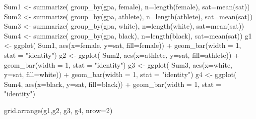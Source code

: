 \documentclass[
]{article}
\newenvironment{Shaded}{\begin{snugshade}}{\end{snugshade}}
\newcommand{\AttributeTok}[1]{\textcolor[rgb]{0.80,0.80,0.80}{#1}}
\newcommand{\DecValTok}[1]{\textcolor[rgb]{0.86,0.86,0.80}{#1}}
\newcommand{\FunctionTok}[1]{\textcolor[rgb]{0.94,0.94,0.56}{#1}}
\newcommand{\NormalTok}[1]{\textcolor[rgb]{0.80,0.80,0.80}{#1}}
\newcommand{\OtherTok}[1]{\textcolor[rgb]{0.94,0.94,0.56}{#1}}
\newcommand{\SpecialCharTok}[1]{\textcolor[rgb]{0.86,0.64,0.64}{#1}}
\newcommand{\StringTok}[1]{\textcolor[rgb]{0.80,0.58,0.58}{#1}}
\begin{document}
\begin{Shaded}
\begin{Highlighting}[]
\NormalTok{Sum1 }\OtherTok{\textless{}{-}} \FunctionTok{summarize}\NormalTok{( }\FunctionTok{group\_by}\NormalTok{(gpa, female), }\AttributeTok{n=}\FunctionTok{length}\NormalTok{(female), }\AttributeTok{sat=}\FunctionTok{mean}\NormalTok{(sat))}
\NormalTok{Sum2 }\OtherTok{\textless{}{-}} \FunctionTok{summarize}\NormalTok{( }\FunctionTok{group\_by}\NormalTok{(gpa, athlete), }\AttributeTok{n=}\FunctionTok{length}\NormalTok{(athlete), }\AttributeTok{sat=}\FunctionTok{mean}\NormalTok{(sat))}
\NormalTok{Sum3 }\OtherTok{\textless{}{-}} \FunctionTok{summarize}\NormalTok{( }\FunctionTok{group\_by}\NormalTok{(gpa, white), }\AttributeTok{n=}\FunctionTok{length}\NormalTok{(white), }\AttributeTok{sat=}\FunctionTok{mean}\NormalTok{(sat))}
\NormalTok{Sum4 }\OtherTok{\textless{}{-}} \FunctionTok{summarize}\NormalTok{( }\FunctionTok{group\_by}\NormalTok{(gpa, black), }\AttributeTok{n=}\FunctionTok{length}\NormalTok{(black), }\AttributeTok{sat=}\FunctionTok{mean}\NormalTok{(sat))}
\NormalTok{g1 }\OtherTok{\textless{}{-}}  \FunctionTok{ggplot}\NormalTok{( Sum1, }\FunctionTok{aes}\NormalTok{(}\AttributeTok{x=}\NormalTok{female, }\AttributeTok{y=}\NormalTok{sat, }\AttributeTok{fill=}\NormalTok{female)) }\SpecialCharTok{+} \FunctionTok{geom\_bar}\NormalTok{(}\AttributeTok{width =} \DecValTok{1}\NormalTok{, }\AttributeTok{stat =} \StringTok{"identity"}\NormalTok{)}
\NormalTok{g2 }\OtherTok{\textless{}{-}}  \FunctionTok{ggplot}\NormalTok{( Sum2, }\FunctionTok{aes}\NormalTok{(}\AttributeTok{x=}\NormalTok{athlete, }\AttributeTok{y=}\NormalTok{sat, }\AttributeTok{fill=}\NormalTok{athlete)) }\SpecialCharTok{+} \FunctionTok{geom\_bar}\NormalTok{(}\AttributeTok{width =} \DecValTok{1}\NormalTok{, }\AttributeTok{stat =} \StringTok{"identity"}\NormalTok{)}
\NormalTok{g3 }\OtherTok{\textless{}{-}}  \FunctionTok{ggplot}\NormalTok{( Sum3, }\FunctionTok{aes}\NormalTok{(}\AttributeTok{x=}\NormalTok{white, }\AttributeTok{y=}\NormalTok{sat, }\AttributeTok{fill=}\NormalTok{white)) }\SpecialCharTok{+} \FunctionTok{geom\_bar}\NormalTok{(}\AttributeTok{width =} \DecValTok{1}\NormalTok{, }\AttributeTok{stat =} \StringTok{"identity"}\NormalTok{)}
\NormalTok{g4 }\OtherTok{\textless{}{-}}  \FunctionTok{ggplot}\NormalTok{( Sum4, }\FunctionTok{aes}\NormalTok{(}\AttributeTok{x=}\NormalTok{black, }\AttributeTok{y=}\NormalTok{sat, }\AttributeTok{fill=}\NormalTok{black)) }\SpecialCharTok{+} \FunctionTok{geom\_bar}\NormalTok{(}\AttributeTok{width =} \DecValTok{1}\NormalTok{, }\AttributeTok{stat =} \StringTok{"identity"}\NormalTok{)}

\FunctionTok{grid.arrange}\NormalTok{(g1,g2, g3, g4, }\AttributeTok{nrow=}\DecValTok{2}\NormalTok{)}
\end{Highlighting}
\end{Shaded}
\end{document}
